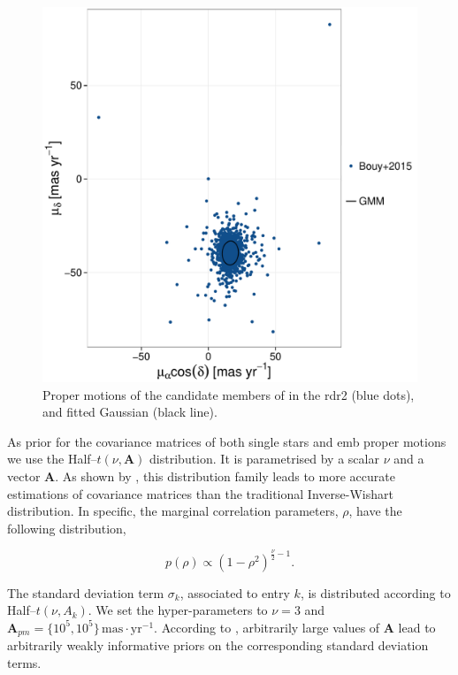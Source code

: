 \begin{figure}[ht!]
    \centering
      \includegraphics[page=1,width=\textwidth]{background/Figures/Hyp_PM_fit.pdf}
\caption{Proper motions of the candidate members of \citet{Bouy2015} in the \gls{rdr2} (blue dots), and fitted Gaussian (black line).}
\label{fig:fitPMone}
\end{figure}


As prior for the covariance matrices of both single stars and \gls{emb} proper motions we use the Half--$t(\nu,\mathbf{A})$ distribution. It is parametrised by a scalar $\nu$ and a vector $\mathbf{A}$. As shown by \citet{Huang2013}, this distribution family leads to more accurate estimations of covariance matrices than the traditional Inverse-Wishart distribution. In specific, the marginal correlation parameters, $\rho$, have the following distribution,

\begin{equation}
p(\rho) \propto (1-\rho^2)^{\frac{\nu}{2}-1}.
\end{equation}

The standard deviation term $\sigma_k$, associated to entry $k$, is distributed according to Half--$t(\nu,A_k)$. We set the hyper-parameters to $\nu=3$ and $\boldsymbol{A}_{pm}=\{10^5,10^5\}\,\mathrm{mas\cdot yr^{-1}}$. According to \citet{Huang2013}, arbitrarily large values of $\boldsymbol{A}$ lead to arbitrarily weakly informative priors on the corresponding standard deviation terms.

